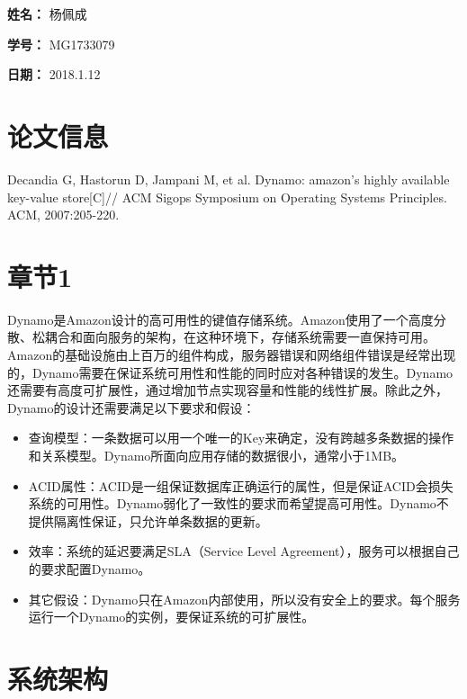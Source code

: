 \documentclass[UTF8]{article}
\begin{document}
    
{\flushleft \bf \Large 姓名：} 杨佩成

{\flushleft \bf \Large 学号：} MG1733079

{\flushleft \bf \Large 日期：} 2018.1.12


\section*{论文信息}
    
Decandia G, Hastorun D, Jampani M, et al. Dynamo: amazon's highly available key-value store[C]// ACM Sigops Symposium on Operating Systems Principles. ACM, 2007:205-220.
    
\section{章节1}
	Dynamo是Amazon设计的高可用性的键值存储系统。Amazon使用了一个高度分散、松耦合和面向服务的架构，在这种环境下，存储系统需要一直保持可用。Amazon的基础设施由上百万的组件构成，服务器错误和网络组件错误是经常出现的，Dynamo需要在保证系统可用性和性能的同时应对各种错误的发生。Dynamo还需要有高度可扩展性，通过增加节点实现容量和性能的线性扩展。除此之外，Dynamo的设计还需要满足以下要求和假设：
\begin{itemize}

	\item
		查询模型：一条数据可以用一个唯一的Key来确定，没有跨越多条数据的操作和关系模型。Dynamo所面向应用存储的数据很小，通常小于1MB。
	\item
           ACID属性：ACID是一组保证数据库正确运行的属性，但是保证ACID会损失系统的可用性。Dynamo弱化了一致性的要求而希望提高可用性。Dynamo不提供隔离性保证，只允许单条数据的更新。
	\item
           效率：系统的延迟要满足SLA（Service Level Agreement），服务可以根据自己的要求配置Dynamo。
	\item
           其它假设：Dynamo只在Amazon内部使用，所以没有安全上的要求。每个服务运行一个Dynamo的实例，要保证系统的可扩展性。
		
\end{itemize}


\section{系统架构}
\end{document}
